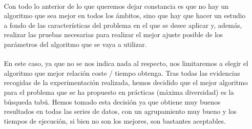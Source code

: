 	\paragraph{}Con todo lo anterior de lo que queremos dejar constancia es que no hay un algoritmo que sea mejor en todos los ámbitos, sino que hay que hacer un estudio a fondo de las características del problema en el que se desee aplicar y, además, realizar las pruebas necesarias para realizar el mejor ajuste posible de los parámetros del algoritmo que se vaya a utilizar.
	
	\paragraph{}En este caso, ya que no se nos indica nada al respecto, nos limitaremos a elegir el algoritmo que mejor relación coste / tiempo obtenga. Tras todas las evidencias recogidas de la experimentación realizada, hemos decidido que el mejor algoritmo para el problema que se ha propuesto en prácticas (máxima diversidad) es la búsqueda tabú. Hemos tomado esta decisión ya que obtiene muy buenos resultados en todas las series de datos, con un agrupamiento muy bueno y los tiempos de ejecución, si bien no son los mejores, son bastantes aceptables.